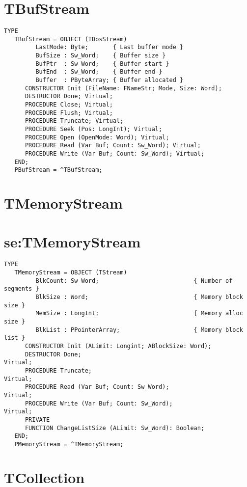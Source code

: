 \section{TBufStream}
\label{se:TBufStream}

\begin{verbatim}
TYPE
   TBufStream = OBJECT (TDosStream)
         LastMode: Byte;       { Last buffer mode }
         BufSize : Sw_Word;    { Buffer size }
         BufPtr  : Sw_Word;    { Buffer start }
         BufEnd  : Sw_Word;    { Buffer end }
         Buffer  : PByteArray; { Buffer allocated }
      CONSTRUCTOR Init (FileName: FNameStr; Mode, Size: Word);
      DESTRUCTOR Done; Virtual;
      PROCEDURE Close; Virtual;
      PROCEDURE Flush; Virtual;
      PROCEDURE Truncate; Virtual;
      PROCEDURE Seek (Pos: LongInt); Virtual;
      PROCEDURE Open (OpenMode: Word); Virtual;
      PROCEDURE Read (Var Buf; Count: Sw_Word); Virtual;
      PROCEDURE Write (Var Buf; Count: Sw_Word); Virtual;
   END;
   PBufStream = ^TBufStream;
\end{verbatim}

\section{TMemoryStream}
\section{se:TMemoryStream}

\begin{verbatim}
TYPE
   TMemoryStream = OBJECT (TStream)
         BlkCount: Sw_Word;                           { Number of segments }
         BlkSize : Word;                              { Memory block size }
         MemSize : LongInt;                           { Memory alloc size }
         BlkList : PPointerArray;                     { Memory block list }
      CONSTRUCTOR Init (ALimit: Longint; ABlockSize: Word);
      DESTRUCTOR Done;                                               Virtual;
      PROCEDURE Truncate;                                            Virtual;
      PROCEDURE Read (Var Buf; Count: Sw_Word);                      Virtual;
      PROCEDURE Write (Var Buf; Count: Sw_Word);                     Virtual;
      PRIVATE
      FUNCTION ChangeListSize (ALimit: Sw_Word): Boolean;
   END;
   PMemoryStream = ^TMemoryStream;
\end{verbatim}

\section{TCollection}
\label{se:TCollection}

